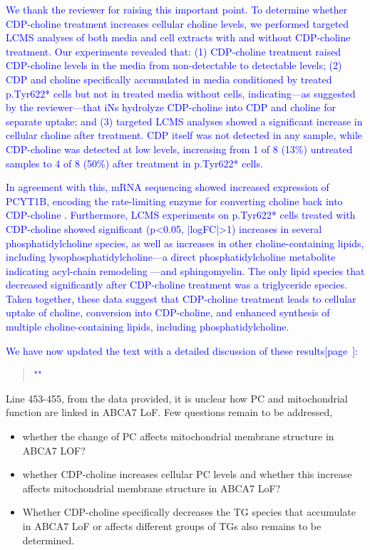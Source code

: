 \textcolor{blue}{We thank the reviewer for raising this important point. To determine whether CDP-choline treatment increases cellular choline levels, we performed targeted LCMS analyses of both media and cell extracts with and without CDP-choline treatment. Our experiments revealed that: (1) CDP-choline treatment raised CDP-choline levels in the media from non-detectable to detectable levels; (2) CDP and choline specifically accumulated in media conditioned by treated p.Tyr622* cells but not in treated media without cells, indicating—as suggested by the reviewer—that iNs hydrolyze CDP-choline into CDP and choline for separate uptake; and (3) targeted LCMS analyses showed a significant increase in cellular choline after treatment. CDP itself was not detected in any sample, while CDP-choline was detected at low levels, increasing from 1 of 8 (13\%) untreated samples to 4 of 8 (50\%) after treatment in p.Tyr622* cells.}

\textcolor{blue}{In agreement with this, mRNA sequencing showed increased expression of PCYT1B, encoding the rate-limiting enzyme for converting choline back into CDP-choline \cite{Lykidis1998-rj}. Furthermore, LCMS experiments on p.Tyr622* cells treated with CDP-choline showed significant (p<0.05, |logFC|>1) increases in several phosphatidylcholine species, as well as increases in other choline-containing lipids, including lysophosphatidylcholine—a direct phosphatidylcholine metabolite indicating acyl-chain remodeling \cite{Wang2019-om}—and sphingomyelin. The only lipid species that decreased significantly after CDP-choline treatment was a triglyceride species. Taken together, these data suggest that CDP-choline treatment leads to cellular uptake of choline, conversion into CDP-choline, and enhanced synthesis of multiple choline-containing lipids, including phosphatidylcholine.}

\textcolor{blue}{We have now updated the text with a detailed discussion of these results[page~\pageref{quoteD-label}]:}
\begin{quote}
	\textcolor{blue}{"\quoteD"}
\end{quote}

Line 453-455, from the data provided, it is unclear how PC and mitochondrial function are linked in ABCA7 LoF. Few questions remain to be addressed,
\begin{itemize}
	\item whether the change of PC affects mitochondrial membrane structure in ABCA7 LOF?

	\item whether CDP-choline increases cellular PC levels and whether this increase affects mitochondrial membrane structure in ABCA7 LoF?
	
	\item Whether CDP-choline specifically decreases the TG species that accumulate in ABCA7 LoF or affects different groups of TGs also remains to be determined.
\end{itemize}

